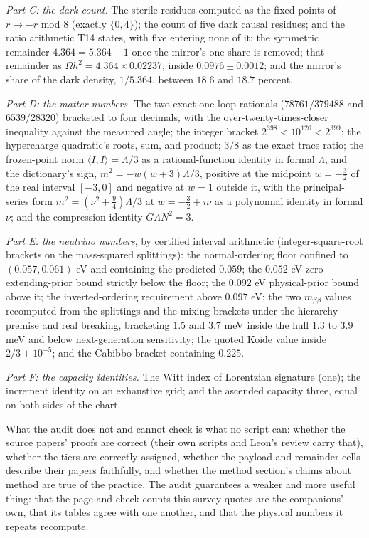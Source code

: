 \documentclass[11pt]{article}
\theoremstyle{definition}
\newcommand{\ip}[2]{\langle #1, #2\rangle}
\begin{document}
\emph{Part C: the dark count.} The sterile residues computed as the fixed points of $r \mapsto -r$ mod 8 (exactly $\{0, 4\}$); the count of five dark causal residues; and the ratio arithmetic T14 states, with five entering none of it: the symmetric remainder $4.364 = 5.364 - 1$ once the mirror's one share is removed; that remainder as $\Omega h^{2} = 4.364 \times 0.02237$, inside $0.0976 \pm 0.0012$; and the mirror's share of the dark density, $1/5.364$, between $18.6$ and $18.7$ percent.

\emph{Part D: the matter numbers.} The two exact one-loop rationals ($78761/379488$ and $6539/28320$) bracketed to four decimals, with the over-twenty-times-closer inequality against the measured angle; the integer bracket $2^{398} < 10^{120} < 2^{399}$; the hypercharge quadratic's roots, sum, and product; $3/8$ as the exact trace ratio; the frozen-point norm $\ip{I}{I} = \Lambda/3$ as a rational-function identity in formal $\Lambda$, and the dictionary's sign, $m^{2} = -w(w+3)\Lambda/3$, positive at the midpoint $w = -\tfrac32$ of the real interval $[-3, 0]$ and negative at $w = 1$ outside it, with the principal-series form $m^{2} = (\nu^{2} + \tfrac94)\Lambda/3$ at $w = -\tfrac32 + i\nu$ as a polynomial identity in formal $\nu$; and the compression identity $G\Lambda N^{2} = 3$.

\emph{Part E: the neutrino numbers}, by certified interval arithmetic (integer-square-root brackets on the mass-squared splittings): the normal-ordering floor confined to $(0.057, 0.061)$ eV and containing the predicted $0.059$; the $0.052$ eV zero-extending-prior bound strictly below the floor; the $0.092$ eV physical-prior bound above it; the inverted-ordering requirement above $0.097$ eV; the two $m_{\beta\beta}$ values recomputed from the splittings and the mixing brackets under the hierarchy premise and real breaking, bracketing $1.5$ and $3.7$ meV inside the hull $1.3$ to $3.9$ meV and below next-generation sensitivity; the quoted Koide value inside $2/3 \pm 10^{-5}$; and the Cabibbo bracket containing $0.225$.

\emph{Part F: the capacity identities.} The Witt index of Lorentzian signature (one); the increment identity on an exhaustive grid; and the ascended capacity three, equal on both sides of the chart.

What the audit does not and cannot check is what no script can: whether the source papers' proofs are correct (their own scripts and Leon's review carry that), whether the tiers are correctly assigned, whether the payload and remainder cells describe their papers faithfully, and whether the method section's claims about method are true of the practice. The audit guarantees a weaker and more useful thing: that the page and check counts this survey quotes are the companions' own, that its tables agree with one another, and that the physical numbers it repeats recompute.
\end{document}

